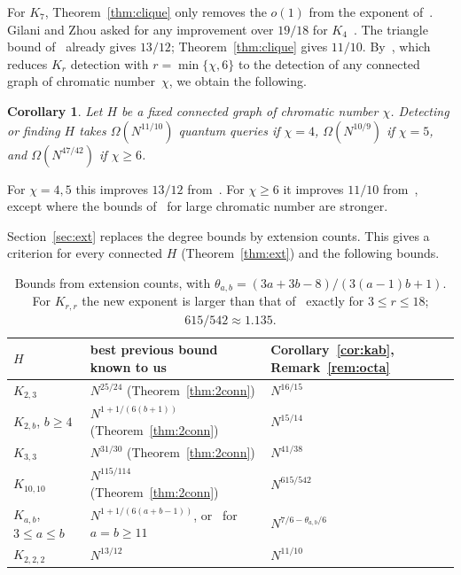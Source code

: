 \documentclass[11pt]{article}
\newtheorem{corollary}[theorem]{Corollary}
\theoremstyle{remark}
\begin{document}
For $K_7$, Theorem~\ref{thm:clique} only removes the $o(1)$ from the exponent of~\cite{GZ26}. Gilani and Zhou asked for any improvement over $19/18$ for $K_4$~\cite[Section~1.4]{GZ26}. The triangle bound of~\cite{CGZ26} already gives $13/12$; Theorem~\ref{thm:clique} gives $11/10$. By~\cite[Theorem~1.3(i)]{GZ26}, which reduces $K_r$ detection with $r=\min\{\chi,6\}$ to the detection of any connected graph of chromatic number~$\chi$, we obtain the following.

\begin{corollary}\label{cor:chromatic}
Let $H$ be a fixed connected graph of chromatic number $\chi$. Detecting or finding $H$ takes $\Omega(N^{11/10})$ quantum queries if $\chi=4$, $\Omega(N^{10/9})$ if $\chi=5$, and $\Omega(N^{47/42})$ if $\chi\ge6$.
\end{corollary}

For $\chi=4,5$ this improves $13/12$ from~\cite{CGZ26}. For $\chi\ge6$ it improves $11/10$ from~\cite{GZ26}, except where the bounds of~\cite[Theorem~1.3(ii)]{GZ26} for large chromatic number are stronger.

Section~\ref{sec:ext} replaces the degree bounds by extension counts. This gives a criterion for every connected $H$ (Theorem~\ref{thm:ext}) and the following bounds.

\begin{table}[h]
\centering
\renewcommand{\arraystretch}{1.2}
\begin{tabular}{@{}lll@{}}
\toprule
$H$ & best previous bound known to us & Corollary~\ref{cor:kab}, Remark~\ref{rem:octa}\\
\midrule
$K_{2,3}$ & $N^{25/24}$ (Theorem~\ref{thm:2conn}) & $N^{16/15}$\\
$K_{2,b}$, $b\ge4$ & $N^{1+1/(6(b+1))}$ (Theorem~\ref{thm:2conn}) & $N^{15/14}$\\
$K_{3,3}$ & $N^{31/30}$ (Theorem~\ref{thm:2conn}) & $N^{41/38}$\\
$K_{10,10}$ & $N^{115/114}$ (Theorem~\ref{thm:2conn}) & $N^{615/542}$\\
$K_{a,b}$, $3\le a\le b$ & $N^{1+1/(6(a+b-1))}$, or~\cite{GZ26} for $a=b\ge11$ & $N^{7/6-\theta_{a,b}/6}$\\
$K_{2,2,2}$ & $N^{13/12}$~\cite{CGZ26} & $N^{11/10}$\\
\bottomrule
\end{tabular}
\caption{Bounds from extension counts, with $\theta_{a,b}=(3a+3b-8)/(3(a-1)b+1)$. For $K_{r,r}$ the new exponent is larger than that of~\cite{GZ26} exactly for $3\le r\le18$; $615/542\approx1.135$.}
\label{tab:ext}
\end{table}
\end{document}
